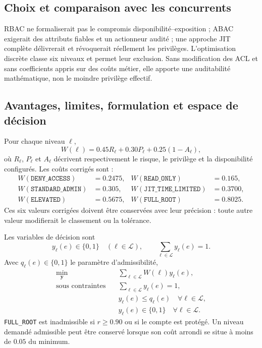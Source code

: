 \documentclass[11pt,a4paper,oneside]{report}
\theoremstyle{definition}
\theoremstyle{plain}
\begin{document}
\subsection*{Choix et comparaison avec les concurrents}

RBAC ne formaliserait pas le compromis disponibilité--exposition ; ABAC exigerait des attributs fiables et un actionneur audité ; une approche JIT complète délivrerait et révoquerait réellement les privilèges. L'optimisation discrète classe six niveaux et permet leur exclusion. Sans modification des ACL et sans coefficients appris sur des coûts métier, elle apporte une auditabilité mathématique, non le moindre privilège effectif.

\subsection*{Avantages, limites, formulation et espace de décision}

Pour chaque niveau $\ell$,
\begin{equation}
W(\ell)=0.45R_\ell+0.30P_\ell+0.25(1-A_\ell),
\label{eq:ai-ro-privilege-cost}
\end{equation}
où $R_\ell$, $P_\ell$ et $A_\ell$ décrivent respectivement le risque, le privilège et la disponibilité configurés. Les coûts corrigés sont :
\begin{align*}
W(\texttt{DENY\_ACCESS})&=0.2475,&
W(\texttt{READ\_ONLY})&=0.165,\\
W(\texttt{STANDARD\_ADMIN})&=0.305,&
W(\texttt{JIT\_TIME\_LIMITED})&=0.3700,\\
W(\texttt{ELEVATED})&=0.5675,&
W(\texttt{FULL\_ROOT})&=0.8025.
\end{align*}
Ces six valeurs corrigées doivent être conservées avec leur précision : toute autre valeur modifierait le classement ou la tolérance.

Les variables de décision sont
\[
y_\ell(e)\in\{0,1\}\quad(\ell\in\mathcal{L}),\qquad
\sum_{\ell\in\mathcal{L}}y_\ell(e)=1.
\]
Avec $q_\ell(e)\in\{0,1\}$ le paramètre d'admissibilité,
\begin{align}
\min_{\mathbf{y}}\quad&
\sum_{\ell\in\mathcal{L}}W(\ell)y_\ell(e),
\label{eq:ai-ro-privilege-objective}\\
\text{sous contraintes}\quad&
\sum_{\ell\in\mathcal{L}}y_\ell(e)=1,\nonumber\\
&y_\ell(e)\leq q_\ell(e)\quad\forall\ell\in\mathcal{L},\nonumber\\
&y_\ell(e)\in\{0,1\}\quad\forall\ell\in\mathcal{L}.
\end{align}
\texttt{FULL\_ROOT} est inadmissible si $r\geq0.90$ ou si le compte est protégé. Un niveau demandé admissible peut être conservé lorsque son coût arrondi se situe à moins de $0.05$ du minimum.
\end{document}
